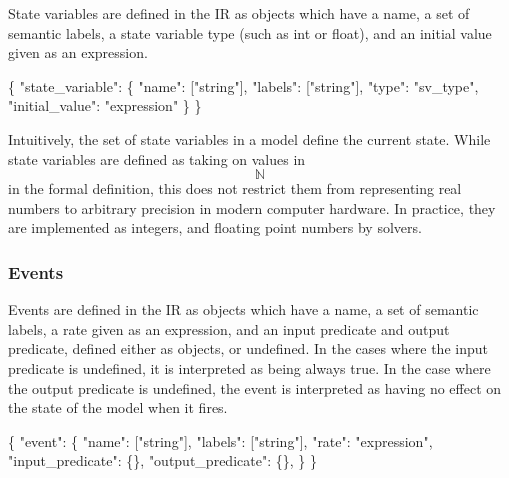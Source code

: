 \documentclass[]{article}
\newenvironment{Shaded}{}{}
\newcommand{\DataTypeTok}[1]{\textcolor[rgb]{0.56,0.13,0.00}{#1}}
\newcommand{\StringTok}[1]{\textcolor[rgb]{0.25,0.44,0.63}{#1}}
\newcommand{\OtherTok}[1]{\textcolor[rgb]{0.00,0.44,0.13}{#1}}
\newcommand{\FunctionTok}[1]{\textcolor[rgb]{0.02,0.16,0.49}{#1}}
\begin{document}
State variables are defined in the IR as objects which have a name, a
set of semantic labels, a state variable type (such as int or float),
and an initial value given as an expression.

\begin{Shaded}
\begin{Highlighting}[]
\FunctionTok{\{} \DataTypeTok{"state_variable"}\FunctionTok{:} \FunctionTok{\{}
    \DataTypeTok{"name"}\FunctionTok{:} \OtherTok{[}\StringTok{"string"}\OtherTok{]}\FunctionTok{,}
    \DataTypeTok{"labels"}\FunctionTok{:} \OtherTok{[}\StringTok{"string"}\OtherTok{]}\FunctionTok{,}
    \DataTypeTok{"type"}\FunctionTok{:} \StringTok{"sv_type"}\FunctionTok{,}
    \DataTypeTok{"initial_value"}\FunctionTok{:} \StringTok{"expression"}
  \FunctionTok{\}}
\FunctionTok{\}}
\end{Highlighting}
\end{Shaded}

Intuitively, the set of state variables in a model define the current
state. While state variables are defined as taking on values in
\[\mathbb{N}\] in the formal definition, this does not restrict them
from representing real numbers to arbitrary precision in modern computer
hardware. In practice, they are implemented as integers, and floating
point numbers by solvers.

\subsubsection{Events}\label{events}

Events are defined in the IR as objects which have a name, a set of
semantic labels, a rate given as an expression, and an input predicate
and output predicate, defined either as objects, or undefined. In the
cases where the input predicate is undefined, it is interpreted as being
always true. In the case where the output predicate is undefined, the
event is interpreted as having no effect on the state of the model when
it fires.

\begin{Shaded}
\begin{Highlighting}[]
\FunctionTok{\{} \DataTypeTok{"event"}\FunctionTok{:} \FunctionTok{\{}
    \DataTypeTok{"name"}\FunctionTok{:} \OtherTok{[}\StringTok{"string"}\OtherTok{]}\FunctionTok{,}
    \DataTypeTok{"labels"}\FunctionTok{:} \OtherTok{[}\StringTok{"string"}\OtherTok{]}\FunctionTok{,}
    \DataTypeTok{"rate"}\FunctionTok{:} \StringTok{"expression"}\FunctionTok{,}
    \DataTypeTok{"input_predicate"}\FunctionTok{:} \FunctionTok{\{\},}
    \DataTypeTok{"output_predicate"}\FunctionTok{:} \FunctionTok{\{\},}
  \FunctionTok{\}}
\FunctionTok{\}}
\end{Highlighting}
\end{Shaded}
\end{document}
